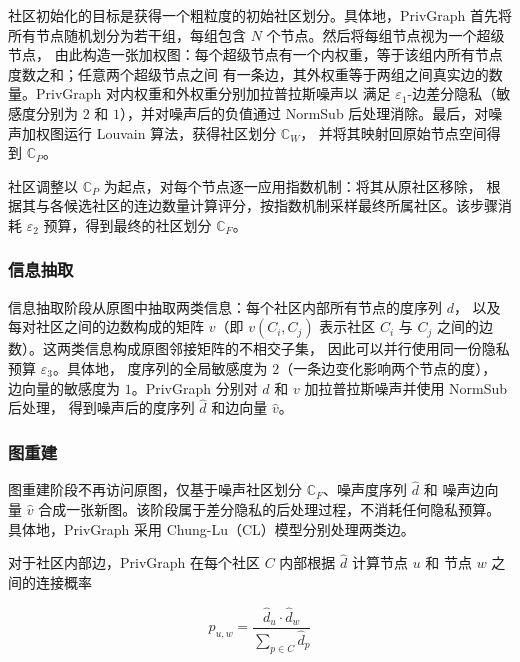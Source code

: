 \par 社区初始化的目标是获得一个粗粒度的初始社区划分。具体地，PrivGraph 
首先将所有节点随机划分为若干组，每组包含 $N$ 个节点。然后将每组节点视为一个超级节点，
由此构造一张加权图：每个超级节点有一个内权重，等于该组内所有节点度数之和；任意两个超级节点之间
有一条边，其外权重等于两组之间真实边的数量。PrivGraph 对内权重和外权重分别加拉普拉斯噪声以
满足 $\varepsilon_1$-边差分隐私（敏感度分别为 $2$ 和 $1$），并对噪声后的负值通过 NormSub 
后处理消除。最后，对噪声加权图运行 Louvain 算法，获得社区划分 $\mathbb{C}_W$，
并将其映射回原始节点空间得到 $\mathbb{C}_P$。

\par 社区调整以 $\mathbb{C}_P$ 为起点，对每个节点逐一应用指数机制：将其从原社区移除，
根据其与各候选社区的连边数量计算评分，按指数机制采样最终所属社区。该步骤消耗 $\varepsilon_2$ 
预算，得到最终的社区划分 $\mathbb{C}_F$。

\subsubsection{信息抽取}

\par \par 信息抽取阶段从原图中抽取两类信息：每个社区内部所有节点的度序列 $d$，
以及每对社区之间的边数构成的矩阵 $v$（即 $v(C_i, C_j)$ 表示社区 $C_i$ 与 $C_j$ 之间的边数）。这两类信息构成原图邻接矩阵的不相交子集，
因此可以并行使用同一份隐私预算 $\varepsilon_3$。具体地，
度序列的全局敏感度为 $2$（一条边变化影响两个节点的度），
边向量的敏感度为 $1$。PrivGraph 分别对 $d$ 和 $v$ 加拉普拉斯噪声并使用 NormSub 后处理，
得到噪声后的度序列 $\hat{d}$ 和边向量 $\hat{v}$。

\subsubsection{图重建}

\par 图重建阶段不再访问原图，仅基于噪声社区划分 $\mathbb{C}_F$、噪声度序列 $\hat{d}$ 和
噪声边向量 $\hat{v}$ 合成一张新图。该阶段属于差分隐私的后处理过程，不消耗任何隐私预算。
具体地，PrivGraph 采用 Chung-Lu（CL）模型分别处理两类边。

\par 对于社区内部边，PrivGraph 在每个社区 $C$ 内部根据 $\hat{d}$ 计算节点 $u$ 和
节点 $w$ 之间的连接概率

\begin{equation}
    \label{equ:cl-intra}
    p_{u, w} = \frac{\hat{d}_u \cdot \hat{d}_w}{\sum_{p \in C} \hat{d}_p}
\end{equation}

